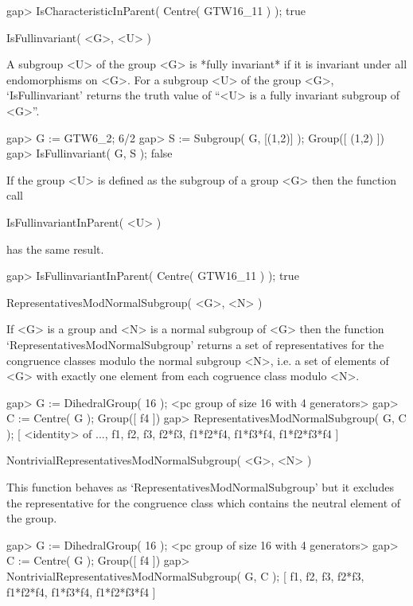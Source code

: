 \beginexample
    gap> IsCharacteristicInParent( Centre( GTW16_11 ) );
    true
\endexample

\>IsFullinvariant( <G>, <U> )

A subgroup <U> of the group <G> is *fully invariant* if it is invariant under
all endomorphisms on <G>. 
For a subgroup <U> of the group <G>, `IsFullinvariant' returns the
truth value of ``<U> is a fully invariant subgroup of <G>''.

\beginexample
    gap> G := GTW6_2;
    6/2
    gap> S := Subgroup( G, [(1,2)] );                                
    Group([ (1,2) ])
    gap> IsFullinvariant( G, S );
    false
\endexample

If the group <U> is defined as the subgroup of a group <G> then the function
call

\>IsFullinvariantInParent( <U> )

has the same result.

\beginexample
    gap> IsFullinvariantInParent( Centre( GTW16_11 ) );
    true
\endexample



\>RepresentativesModNormalSubgroup( <G>, <N> )

If <G> is a group and <N> is a normal subgroup of <G> then the function
`RepresentativesModNormalSubgroup' returns a set of representatives for
the congruence classes modulo the normal subgroup <N>, i.e. a set of elements
of <G> with exactly one element from each cogruence class modulo <N>.

\beginexample
    gap> G := DihedralGroup( 16 );
    <pc group of size 16 with 4 generators>
    gap> C := Centre( G );
    Group([ f4 ])
    gap> RepresentativesModNormalSubgroup( G, C );
    [ <identity> of ..., f1, f2, f3, f2*f3, f1*f2*f4, f1*f3*f4, 
      f1*f2*f3*f4 ]
\endexample

\>NontrivialRepresentativesModNormalSubgroup( <G>, <N> )

This function behaves as `RepresentativesModNormalSubgroup' but it excludes
the representative for the congruence class which contains the neutral element
of the group.

\beginexample
    gap> G := DihedralGroup( 16 );
    <pc group of size 16 with 4 generators>
    gap> C := Centre( G );
    Group([ f4 ])
    gap> NontrivialRepresentativesModNormalSubgroup( G, C );
    [ f1, f2, f3, f2*f3, f1*f2*f4, f1*f3*f4, f1*f2*f3*f4 ]
\endexample



